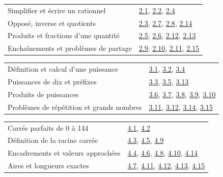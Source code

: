\begin{tabularx}{\linewidth}{@{}Yl@{}}\toprule
Simplifier et écrire un rationnel & \hyperref[exo-2-1]{2.1}, \hyperref[exo-2-2]{2.2}, \hyperref[exo-2-4]{2.4}\\[2mm]
Opposé, inverse et quotients & \hyperref[exo-2-3]{2.3}, \hyperref[exo-2-7]{2.7}, \hyperref[exo-2-8]{2.8}, \hyperref[exo-2-14]{2.14}\\[2mm]
Produits et fractions d’une quantité & \hyperref[exo-2-5]{2.5}, \hyperref[exo-2-6]{2.6}, \hyperref[exo-2-12]{2.12}, \hyperref[exo-2-13]{2.13}\\[2mm]
Enchaînements et problèmes de partage & \hyperref[exo-2-9]{2.9}, \hyperref[exo-2-10]{2.10}, \hyperref[exo-2-11]{2.11}, \hyperref[exo-2-15]{2.15}\\[2mm]
\bottomrule\end{tabularx}\par\vspace{4mm}
\begin{tabularx}{\linewidth}{@{}Yl@{}}\toprule
Définition et calcul d’une puissance & \hyperref[exo-3-1]{3.1}, \hyperref[exo-3-2]{3.2}, \hyperref[exo-3-4]{3.4}\\[2mm]
Puissances de dix et préfixes & \hyperref[exo-3-3]{3.3}, \hyperref[exo-3-5]{3.5}, \hyperref[exo-3-13]{3.13}\\[2mm]
Produits de puissances & \hyperref[exo-3-6]{3.6}, \hyperref[exo-3-7]{3.7}, \hyperref[exo-3-8]{3.8}, \hyperref[exo-3-9]{3.9}, \hyperref[exo-3-10]{3.10}\\[2mm]
Problèmes de répétition et grands nombres & \hyperref[exo-3-11]{3.11}, \hyperref[exo-3-12]{3.12}, \hyperref[exo-3-14]{3.14}, \hyperref[exo-3-15]{3.15}\\[2mm]
\bottomrule\end{tabularx}\par\vspace{4mm}
\clearpage
{}\fontsize{10}{13}\selectfont
{}\begin{tabularx}{\linewidth}{@{}Yl@{}}\toprule
Carrés parfaits de 0 à 144 & \hyperref[exo-4-1]{4.1}, \hyperref[exo-4-2]{4.2}\\[2mm]
Définition de la racine carrée & \hyperref[exo-4-3]{4.3}, \hyperref[exo-4-5]{4.5}, \hyperref[exo-4-9]{4.9}\\[2mm]
Encadrements et valeurs approchées & \hyperref[exo-4-4]{4.4}, \hyperref[exo-4-6]{4.6}, \hyperref[exo-4-8]{4.8}, \hyperref[exo-4-10]{4.10}, \hyperref[exo-4-14]{4.14}\\[2mm]
Aires et longueurs exactes & \hyperref[exo-4-7]{4.7}, \hyperref[exo-4-11]{4.11}, \hyperref[exo-4-12]{4.12}, \hyperref[exo-4-13]{4.13}, \hyperref[exo-4-15]{4.15}\\[2mm]
\bottomrule\end{tabularx}\par\vspace{4mm}
